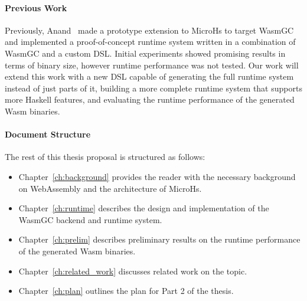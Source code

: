 \paragraph{Previous Work}

Previously, Anand~\cite{anandthesis} made a prototype extension to MicroHs to target WasmGC and implemented a proof-of-concept runtime system written in a combination of WasmGC and a custom DSL. Initial experiments showed promising results in terms of binary size, however runtime performance was not tested. Our work will extend this work with a new DSL capable of generating the full runtime system instead of just parts of it, building a more complete runtime system that supports more Haskell features, and evaluating the runtime performance of the generated Wasm binaries.

\paragraph{Document Structure} The rest of this thesis proposal is structured as follows:
\begin{itemize}
    \item Chapter~\ref{ch:background} provides the reader with the necessary background on WebAssembly and the architecture of MicroHs.
    \item Chapter~\ref{ch:runtime} describes the design and implementation of the WasmGC backend and runtime system.
    \item Chapter~\ref{ch:prelim} describes preliminary results on the runtime performance of the generated Wasm binaries.
    \item Chapter~\ref{ch:related_work} discusses related work on the topic.
    \item Chapter~\ref{ch:plan} outlines the plan for Part 2 of the thesis.
\end{itemize}